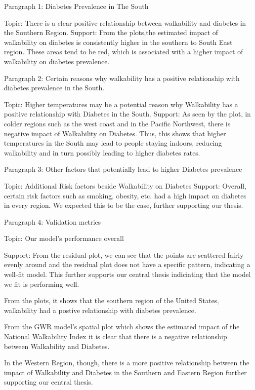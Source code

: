 \documentclass[
]{article}
\begin{document}
Paragraph 1: Diabetes Prevalence in The South

Topic: There is a clear positive relationship between walkability and
diabetes in the Southern Region. Support: From the plots,the estimated
impact of walkability on diabetes is consistently higher in the southern
to South East region. These areas tend to be red, which is associated
with a higher impact of walkability on diabetes prevalence.

Paragraph 2: Certain reasons why walkability has a positive relationship
with diabetes prevalence in the South.

Topic: Higher temperatures may be a potential reason why Walkability has
a positive relationship with Diabetes in the South. Support: As seen by
the plot, in colder regions such as the west coast and in the Pacific
Northwest, there is negative impact of Walkability on Diabetes. Thus,
this shows that higher temperatures in the South may lead to people
staying indoors, reducing walkability and in turn possibly leading to
higher diabetes rates.

Paragraph 3: Other factors that potentially lead to higher Diabetes
prevalence

Topic: Additional Risk factors beside Walkability on Diabetes Support:
Overall, certain risk factors such as smoking, obesity, etc. had a high
impact on diabetes in every region. We expected this to be the case,
further supporting our thesis.

Paragraph 4: Validation metrics

Topic: Our model's performance overall

Support: From the residual plot, we can see that the points are
scattered fairly evenly around and the residual plot does not have a
specific pattern, indicating a well-fit model. This further supports our
central thesis indiciating that the model we fit is performing well.

From the plots, it shows that the southern region of the United States,
walkability had a postive relationship with diabetes prevalence.

From the GWR model's spatial plot which shows the estimated impact of
the National Walkability Index it is clear that there is a negative
relationship between Walkability and Diabetes.

In the Western Region, though, there is a more positive relationship
between the impact of Walkability and Diabetes in the Southern and
Eastern Region further supporting our central thesis.
\end{document}
